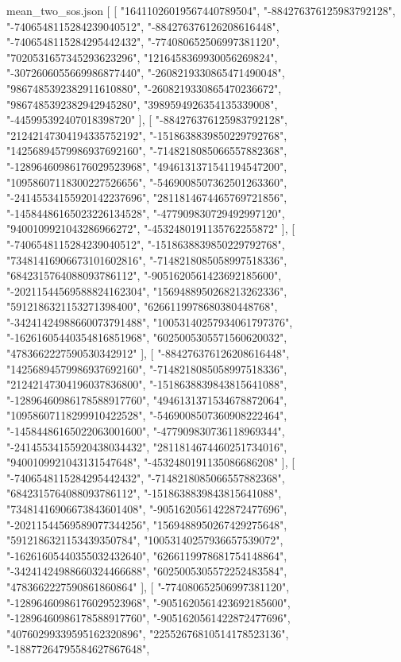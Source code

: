 \begin{filecontents*}[overwrite]{mean_two_sos.json}
  [
   [
    "16411026019567440789504",
    "-884276376125983792128",
    "-7406548115284239040512",
    "-884276376126208616448",
    "-7406548115284295442432",
    "-774080652506997381120",
    "7020531657345293623296",
    "1216458369930056269824",
    "-3072606055669986877440",
    "-2608219330865471490048",
    "9867485392382911610880",
    "-2608219330865470236672",
    "9867485392382942945280",
    "3989594926354135339008",
    "-445995392407018398720"
   ],
   [
    "-884276376125983792128",
    "21242147304194335752192",
    "-1518638839850229792768",
    "14256894579986937692160",
    "-7148218085066557882368",
    "-12896460986176029523968",
    "4946131371541194547200",
    "10958607118300227526656",
    "-5469008507362501263360",
    "-24145534155920142237696",
    "2811814674465769721856",
    "-14584486165023226134528",
    "-477909830729492997120",
    "9400109921043286966272",
    "-4532480191135762255872"
   ],
   [
    "-7406548115284239040512",
    "-1518638839850229792768",
    "73481416906673101602816",
    "-7148218085058997518336",
    "6842315764088093786112",
    "-9051620561423692185600",
    "-20211544569588824162304",
    "1569488950268213262336",
    "5912186321153271398400",
    "6266119978680380448768",
    "-34241424988660073791488",
    "10053140257934061797376",
    "-16261605440354816851968",
    "6025005305571560620032",
    "4783662227590530342912"
   ],
   [
    "-884276376126208616448",
    "14256894579986937692160",
    "-7148218085058997518336",
    "21242147304196037836800",
    "-1518638839843815641088",
    "-12896460986178588917760",
    "4946131371534678872064",
    "10958607118299910422528",
    "-5469008507360908222464",
    "-14584486165022063001600",
    "-477909830736118969344",
    "-24145534155920438034432",
    "2811814674460251734016",
    "9400109921043131547648",
    "-4532480191135086686208"
   ],
   [
    "-7406548115284295442432",
    "-7148218085066557882368",
    "6842315764088093786112",
    "-1518638839843815641088",
    "73481416906673843601408",
    "-9051620561422872477696",
    "-20211544569589077344256",
    "1569488950267429275648",
    "5912186321153439350784",
    "10053140257936657539072",
    "-16261605440355032432640",
    "6266119978681754148864",
    "-34241424988660324466688",
    "6025005305572252483584",
    "4783662227590861860864"
   ],
   [
    "-774080652506997381120",
    "-12896460986176029523968",
    "-9051620561423692185600",
    "-12896460986178588917760",
    "-9051620561422872477696",
    "40760299339595162320896",
    "22552676810514178523136",
    "-18877264795584627867648",

\end{filecontents*}
